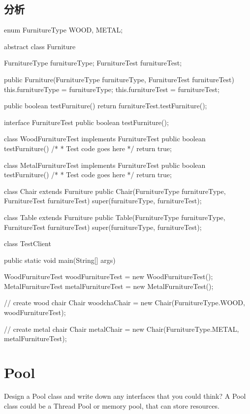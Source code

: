 \subsection{分析}
\begin{Code}
	enum FurnitureType {
		WOOD, METAL;
	}
	
	abstract class Furniture {
		FurnitureType furnitureType;
		FurnitureTest furnitureTest;
		
		public Furniture(FurnitureType furnitureType, FurnitureTest furnitureTest) {
			this.furnitureType = furnitureType;
			this.furnitureTest = furnitureTest;
		}
		
		public boolean testFurniture() {
			return furnitureTest.testFurniture();
		}
		
	}
	
	interface FurnitureTest {
		public boolean testFurniture();
	}
	
	class WoodFurnitureTest implements FurnitureTest {
		public boolean testFurniture() {
			/*
			* Test code goes here
			*/
			return true;
		}
	}
	
	class MetalFurnitureTest implements FurnitureTest {
		public boolean testFurniture() {
			/*
			* Test code goes here
			*/
			return true;
		}
	}
	
	class Chair extends Furniture {
		public Chair(FurnitureType furnitureType, FurnitureTest furnitureTest) {
			super(furnitureType, furnitureTest);
		}
	}
	
	class Table extends Furniture {
		public Table(FurnitureType furnitureType, FurnitureTest furnitureTest) {
			super(furnitureType, furnitureTest);
		}
	}
	
	class TestClient {
		public static void main(String[] args) {
			
			WoodFurnitureTest woodFurnitureTest = new WoodFurnitureTest();
			MetalFurnitureTest metalFurnitureTest = new MetalFurnitureTest();
			
			// create wood chair
			Chair woodchaChair = new Chair(FurnitureType.WOOD, woodFurnitureTest);
			
			// create metal chair
			Chair metalChair = new Chair(FurnitureType.METAL, metalFurnitureTest);
		}
	}
\end{Code}

\section{Pool}
Design a Pool class and write down any interfaces that you could think? A Pool class could be a Thread Pool or memory pool, that can store resources.

